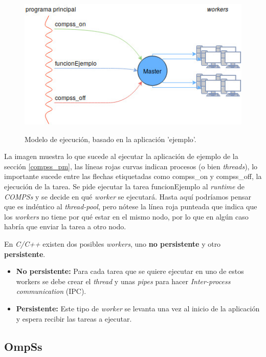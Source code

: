 \documentclass[a4paper]{article}
\begin{document}
\begin{figure}[H]
    \centering 
    \caption{Modelo de ejecución, basado en la aplicación 'ejemplo'.}
    \includegraphics[scale=0.75]{sta-masterworker.jpg}
    \label{fig:masterworker_pool}
\end{figure}

La imagen muestra lo que sucede al ejecutar la aplicación de ejemplo de la sección \ref{compss_pm}, las líneas rojas curvas indican procesos (o bien \textit{threads}), lo importante sucede entre las flechas etiquetadas como compss\_on y compss\_off, la ejecución de la tarea. Se pide ejecutar la tarea funcionEjemplo al \textit{runtime} de \textit{COMPSs} y se decide en qué \textit{worker} se ejecutará. Hasta aquí podríamos pensar que es indéntico al \textit{thread-pool}, pero nótese la línea roja punteada que indica que los \textit{workers} no tiene por qué estar en el mismo nodo, por lo que en algún caso habría que enviar la tarea a otro nodo.
\par\bigskip

En \textit{C/C++} existen dos posibles \textit{workers}, uno \textbf{no persistente} y otro \textbf{persistente}. 

\begin{itemize}
 \item \textbf{No persistente:} Para cada tarea que se quiere ejecutar en uno de estos workers se debe crear el \textit{thread} y unas \textit{pipes} para hacer \textit{Inter-process communication} (IPC). %
 \item \textbf{Persistente:} Este tipo de \textit{worker} se levanta una vez al inicio de la aplicación y espera recibir las tareas a ejecutar.
\end{itemize}


\subsection{OmpSs}
\end{document}
